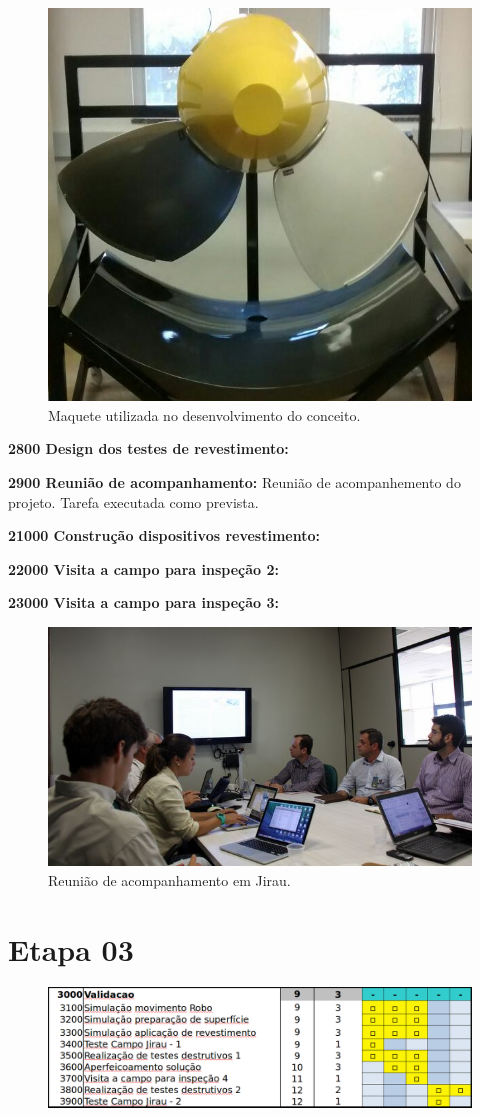 \begin{figure}[h!]
\centering
\includegraphics[width=0.6\columnwidth]{figs/maquete}
\caption{Maquete utilizada no desenvolvimento do conceito.}
\end{figure} 

  
\noindent
\textbf{2800 Design dos testes de revestimento:} %

\noindent
\textbf{2900 Reunião de acompanhamento:} Reunião de acompanhemento do projeto.
Tarefa executada como prevista.

\noindent
\textbf{21000 Construção dispositivos revestimento:}


\noindent
\textbf{22000 Visita a campo para inspeção 2:}


\noindent
\textbf{23000 Visita a campo para inspeção 3:}

\begin{figure}\centering
\includegraphics[width=0.6\columnwidth]{figs/img_4836}
\caption{Reunião de acompanhamento em Jirau.}
\end{figure} 

\section{Etapa 03} 

\begin{figure}[H]
\centering
\includegraphics[width=0.9\columnwidth]{figs/etapa3_completo}
\end{figure} 


